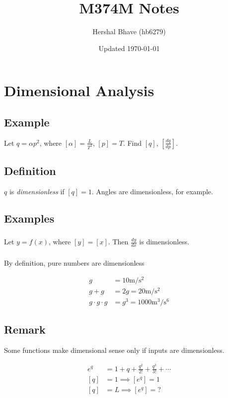 \documentclass[12pt]{article}
\title{M374M Notes}
\author{Hershal Bhave (hb6279)}
\date{Updated \today}
\begin{document}
\maketitle
\tableofcontents

\section{Dimensional Analysis}
\subsection{Example}
Let $q = \alpha p^2$, where $[\alpha] = \frac{L}{T^2}$, $[p] = T$. Find $[q]$,
$\left[\frac{dq}{dp}\right]$.

\subsection{Definition}
$q$ is \emph{dimensionless} if $[q] = 1$. Angles are dimensionless, for example.

\subsection{Examples}
\subsubsection{}
Let $y = f(x)$, where $[y] = [x]$. Then $\frac{dy}{dx}$ is dimensionless.

\subsubsection{}
By definition, pure numbers are dimensionless

\begin{equation}
  \begin{aligned}
    g &= 10 \text{m}/\text{s}^2 \\
    g + g &= 2g = 20 \text{m}/\text{s}^2 \\
    g \cdot g \cdot g & = g^3 = 1000 \text{m}^3/\text{s}^6
  \end{aligned}
\end{equation}

\subsection{Remark}
Some functions make dimensional sense only if inputs are dimensionless.

\begin{equation}
  \begin{aligned}
    e^q &= 1 + q + \frac{q^2}{2!} + \frac{q^3}{3!} + \cdots \\
    [q] &= 1 \implies [e^q] = 1 \\
    [q] &= L \implies [e^q] = ?
  \end{aligned}
\end{equation}
\end{document}
